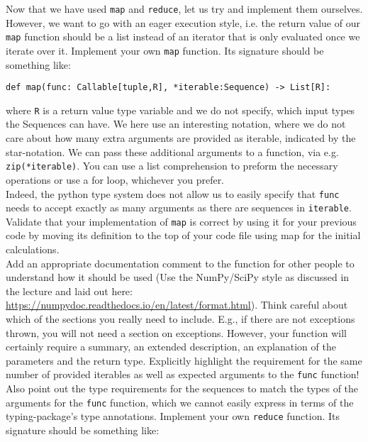 \documentclass[]{erlangen-problemset}
\begin{document}
\begin{problem}[title={Building our own map and reduce functions}]
\noindent
Now that we have used \texttt{map} and \texttt{reduce}, let us try and implement them ourselves. 
However, we want to go with an eager execution style, i.e. the return value of our \texttt{map} function should be a list instead of an iterator that is only evaluated once we iterate over it.
\Question Implement your own \texttt{map} function. Its signature should be something like:
\begin{center}
	\texttt{def map(func: Callable[tuple,R], *iterable:Sequence) -> List[R]:}
\end{center}
where \texttt{R} is a return value type variable and we do not specify, which input types the Sequences can have. 
We here use an interesting notation, where we do not care about how many extra arguments are provided as iterable, indicated by the star-notation. 
We can pass these additional arguments to a function, via e.g. \texttt{zip(*iterable)}. 
You can use a list comprehension to preform the necessary operations or use a for loop, whichever you prefer.\\
Indeed, the python type system does not allow us to easily specify that \texttt{func} needs to accept exactly as many arguments as there are sequences in \texttt{iterable}.\\
Validate that your implementation of \texttt{map} is correct by using it for your previous code by moving its definition to the top of your code file using map for the initial calculations.\\
Add an appropriate documentation comment to the function for other people to understand how it should be used (Use the NumPy/SciPy style as discussed in the lecture and laid out here: \url{https://numpydoc.readthedocs.io/en/latest/format.html}). 
Think careful about which of the sections you really need to include. 
E.g., if there are not exceptions thrown, you will not need a section on exceptions. 
However, your function will certainly require a summary, an extended description, an explanation of the parameters and the return type.
Explicitly highlight the requirement for the same number of provided iterables as well as expected arguments to the \texttt{func} function! 
Also point out the type requirements for the sequences to match the types of the arguments for the \texttt{func} function, which we cannot easily express in terms of the typing-package's type annotations.
\Question Implement your own \texttt{reduce} function. Its signature should be something like:

\end{problem}
\end{document}

